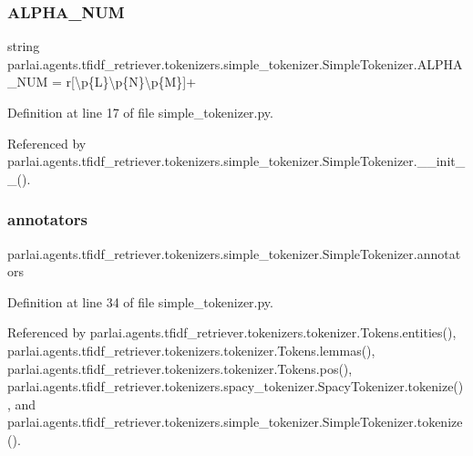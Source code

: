 \subsubsection{\texorpdfstring{A\+L\+P\+H\+A\+\_\+\+N\+UM}{ALPHA\_NUM}}
{\footnotesize\ttfamily string parlai.\+agents.\+tfidf\+\_\+retriever.\+tokenizers.\+simple\+\_\+tokenizer.\+Simple\+Tokenizer.\+A\+L\+P\+H\+A\+\_\+\+N\+UM = r\textquotesingle{}\mbox{[}\textbackslash{}p\{L\}\textbackslash{}p\{N\}\textbackslash{}p\{M\}\mbox{]}+\textquotesingle{}\hspace{0.3cm}{\ttfamily [static]}}



Definition at line 17 of file simple\+\_\+tokenizer.\+py.



Referenced by parlai.\+agents.\+tfidf\+\_\+retriever.\+tokenizers.\+simple\+\_\+tokenizer.\+Simple\+Tokenizer.\+\_\+\+\_\+init\+\_\+\+\_\+().

\mbox{\label{classparlai_1_1agents_1_1tfidf__retriever_1_1tokenizers_1_1simple__tokenizer_1_1SimpleTokenizer_aa2edbea9c08e8b1fbe5eef7d61e3f432}} 
\subsubsection{\texorpdfstring{annotators}{annotators}}
{\footnotesize\ttfamily parlai.\+agents.\+tfidf\+\_\+retriever.\+tokenizers.\+simple\+\_\+tokenizer.\+Simple\+Tokenizer.\+annotators}



Definition at line 34 of file simple\+\_\+tokenizer.\+py.



Referenced by parlai.\+agents.\+tfidf\+\_\+retriever.\+tokenizers.\+tokenizer.\+Tokens.\+entities(), parlai.\+agents.\+tfidf\+\_\+retriever.\+tokenizers.\+tokenizer.\+Tokens.\+lemmas(), parlai.\+agents.\+tfidf\+\_\+retriever.\+tokenizers.\+tokenizer.\+Tokens.\+pos(), parlai.\+agents.\+tfidf\+\_\+retriever.\+tokenizers.\+spacy\+\_\+tokenizer.\+Spacy\+Tokenizer.\+tokenize(), and parlai.\+agents.\+tfidf\+\_\+retriever.\+tokenizers.\+simple\+\_\+tokenizer.\+Simple\+Tokenizer.\+tokenize().

